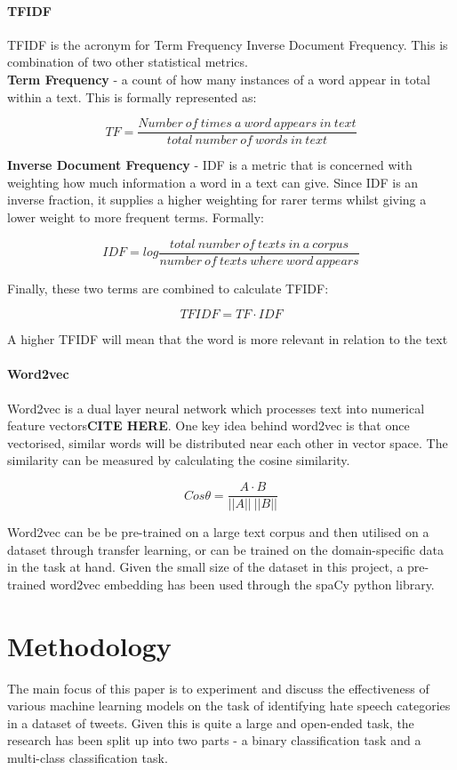 \documentclass[conference]{IEEEtran}
\begin{document}
\paragraph{\textbf{TFIDF}}
TFIDF is the acronym for Term Frequency Inverse Document Frequency. This is combination of two other statistical metrics.\\
\textbf{Term Frequency} - a count of how many instances of a word appear in total within a text. This is formally represented as:

\[ TF = \frac{Number\: of\: times\: a\: word\: appears\: in\: text}{total\: number\: of\: words\: in\: text}\]

\textbf{Inverse Document Frequency} - IDF is a metric that is concerned with weighting how much information a word in a text can give. Since IDF is an inverse fraction, it supplies a higher weighting for rarer terms whilst giving a lower weight to more frequent terms. Formally:

\[ IDF = log \frac{total \: number \: of \: texts \: in \: a \: corpus}{number \:
of \: texts \: where \: word \: appears}\]

Finally, these two terms are combined to calculate TFIDF:

\[ TFIDF = TF \cdot IDF \]

A higher TFIDF will mean that the word is more relevant in relation to the text\\

\paragraph{\textbf{Word2vec}}
Word2vec is a dual layer neural network which processes text into numerical feature vectors\textbf{CITE HERE}. One key idea behind word2vec is that once vectorised, similar words will be distributed near each other in vector space. The similarity can be measured by calculating the cosine similarity.

\[ Cos\theta = \frac{A \cdot B}{|| A || \: || B ||}\]

Word2vec can be be pre-trained on a large text corpus and then utilised on a dataset through transfer learning, or can be trained on the domain-specific data in the task at hand. Given the small size of the dataset in this project, a pre-trained word2vec embedding has been used through the spaCy python library. \\

\section{Methodology}
The main focus of this paper is to experiment and discuss the effectiveness of various machine learning models on the task of identifying hate speech categories in a dataset of tweets. Given this is quite a large and open-ended task, the research has been split up into two parts - a binary classification task and a multi-class classification task.
\end{document}
